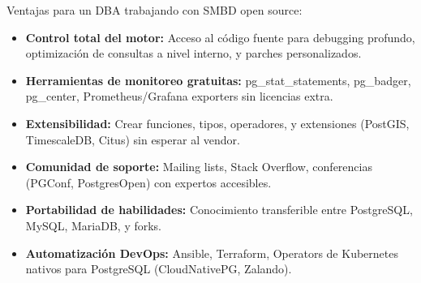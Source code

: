 Ventajas para un DBA trabajando con SMBD open source:

\begin{itemize}
    \item \textbf{Control total del motor:} Acceso al código fuente para debugging profundo, optimización de consultas a nivel interno, y parches personalizados.
    \item \textbf{Herramientas de monitoreo gratuitas:} pg\_stat\_statements, pg\_badger, pg\_center, Prometheus/Grafana exporters sin licencias extra.
    \item \textbf{Extensibilidad:} Crear funciones, tipos, operadores, y extensiones (PostGIS, TimescaleDB, Citus) sin esperar al vendor.
    \item \textbf{Comunidad de soporte:} Mailing lists, Stack Overflow, conferencias (PGConf, PostgresOpen) con expertos accesibles.
    \item \textbf{Portabilidad de habilidades:} Conocimiento transferible entre PostgreSQL, MySQL, MariaDB, y forks.
    \item \textbf{Automatización DevOps:} Ansible, Terraform, Operators de Kubernetes nativos para PostgreSQL (CloudNativePG, Zalando).
\end{itemize}